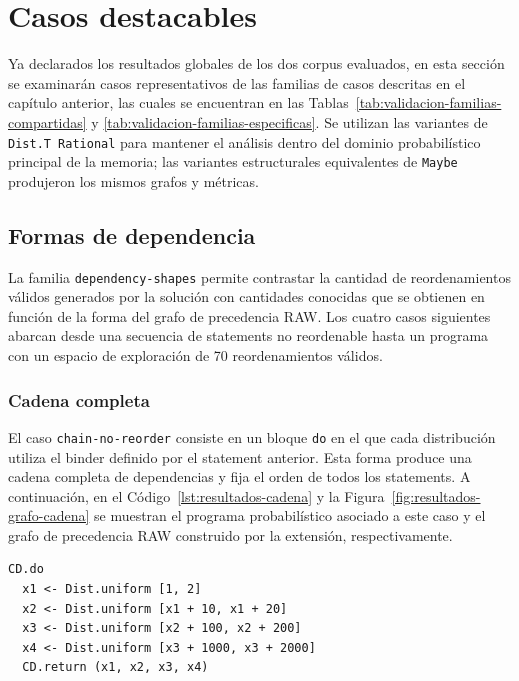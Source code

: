 
\section{Casos destacables}
\label{sec:resultados-casos-destacables}

Ya declarados los resultados globales de los dos corpus evaluados, en esta sección se examinarán casos representativos de las familias de casos descritas en el capítulo anterior, las cuales se encuentran en las Tablas~\ref{tab:validacion-familias-compartidas} y \ref{tab:validacion-familias-especificas}. Se utilizan las variantes de \texttt{Dist.T Rational} para mantener el análisis dentro del dominio probabilístico principal de la memoria; las variantes estructurales equivalentes de \texttt{Maybe} produjeron los mismos grafos y métricas.

\subsection{Formas de dependencia}

La familia \texttt{dependency-shapes} permite contrastar la cantidad de reordenamientos válidos generados por la solución con cantidades conocidas que se obtienen en función de la forma del grafo de precedencia RAW. Los cuatro casos siguientes abarcan desde una secuencia de statements no reordenable hasta un programa con un espacio de exploración de 70 reordenamientos válidos.

\subsubsection{Cadena completa}

El caso \texttt{chain-no-reorder} consiste en un bloque \texttt{do} en el que cada distribución utiliza el binder definido por el statement anterior. Esta forma produce una cadena completa de dependencias y fija el orden de todos los statements. A continuación, en el Código~\ref{lst:resultados-cadena} y la Figura~\ref{fig:resultados-grafo-cadena} se muestran el programa probabilístico asociado a este caso y el grafo de precedencia RAW construido por la extensión, respectivamente.

\begin{lstlisting}[style=haskell,caption={Programa probabilístico asociado al caso \texttt{chain-no-reorder}.},label={lst:resultados-cadena}]
CD.do
  x1 <- Dist.uniform [1, 2]
  x2 <- Dist.uniform [x1 + 10, x1 + 20]
  x3 <- Dist.uniform [x2 + 100, x2 + 200]
  x4 <- Dist.uniform [x3 + 1000, x3 + 2000]
  CD.return (x1, x2, x3, x4)
\end{lstlisting}

